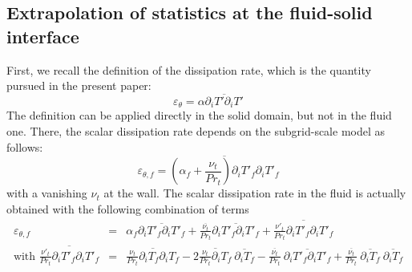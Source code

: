 \documentclass{svjour3}                     %
\begin{document}
\subsection{Extrapolation of statistics at the fluid-solid interface}
\label{subsec-extrapol}

First, we recall the definition of the dissipation rate, which is the quantity pursued in the present paper:
\begin{equation}
\varepsilon_\theta = \alpha \overline{\partial_i T' \partial_i T'}
\end{equation}
The definition can be applied directly in the solid domain, but not in the fluid one.
There, the scalar dissipation rate depends on the subgrid-scale model as follows:
\begin{equation}
\varepsilon_{\theta,f} = \overline{\left( \alpha_f + \frac{\nu_t}{Pr_t} \right) \partial_i T'_f \partial_i T'_f}
\end{equation}
with a vanishing $\nu_t$ at the wall.
The scalar dissipation rate in the fluid is actually obtained with the following combination of terms
\begin{eqnarray}
\varepsilon_{\theta,f} & = & \alpha_f \overline{\partial_i T'_f \partial_i T'_f} + \frac{\overline{\nu_t}}{Pr_t} \overline{\partial_i T'_f \partial_i T'_f} + \overline{\frac{\nu'_t}{Pr_t} \partial_i T'_f \partial_i T'_f} \\
\mbox{with } \overline{\frac{\nu'_t}{Pr_t} \partial_i T'_f \partial_i T'_f} & = & \overline{\frac{\nu_t}{Pr_t} \partial_i T_f \partial_i T_f} - 2 \overline{\frac{\nu_t}{Pr_t} \partial_i T_f}~\overline{\partial_i T_f} - \frac{\overline{\nu_t}}{Pr_t}~\overline{\partial_i T'_f \partial_i T'_f} + \frac{\overline{\nu_t}}{Pr_t}~\overline{\partial_i T_f}~\overline{\partial_i T_f} \nonumber
\end{eqnarray}
\end{document}

